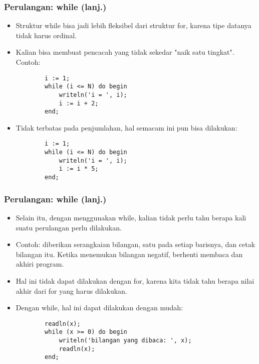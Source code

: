 \documentclass{beamer}
\begin{document}
\begin{frame}[fragile]
\frametitle{Perulangan: while (lanj.)} 
\begin{itemize}
	\item Struktur while bisa jadi lebih fleksibel dari struktur for, karena tipe datanya tidak harus ordinal.
	\item Kalian bisa membuat pencacah yang tidak sekedar "naik satu tingkat". Contoh:
	\begin{lstlisting}
		i := 1;
		while (i <= N) do begin
		    writeln('i = ', i);
		    i := i + 2;
		end;
	\end{lstlisting}
	
	\item Tidak terbatas pada penjumlahan, hal semacam ini pun bisa dilakukan:
	\begin{lstlisting}
		i := 1;
		while (i <= N) do begin
		    writeln('i = ', i);
		    i := i * 5;
		end;
	\end{lstlisting}
\end{itemize}
\end{frame}

\begin{frame}[fragile]
\frametitle{Perulangan: while (lanj.)} 
\begin{itemize}
	\item Selain itu, dengan menggunakan while, kalian tidak perlu tahu berapa kali suatu perulangan perlu dilakukan.
	\item Contoh: diberikan serangkaian bilangan, satu pada setiap barisnya, dan cetak bilangan itu. Ketika menemukan bilangan negatif, berhenti membaca dan akhiri program.
	\item Hal ini tidak dapat dilakukan dengan for, karena kita tidak tahu berapa nilai akhir dari for yang harus dilakukan.
	\item Dengan while, hal ini dapat dilakukan dengan mudah:
	\begin{lstlisting}
		readln(x);
		while (x >= 0) do begin
		    writeln('bilangan yang dibaca: ', x);
		    readln(x);
		end;
	\end{lstlisting}
\end{itemize}
\end{frame}
\end{document}
